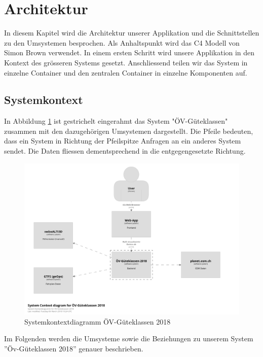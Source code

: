 
\section{Architektur}
\label{Architektur}

In diesem Kapitel wird die Architektur unserer Applikation und die Schnittstellen zu den Umsystemen besprochen. Als Anhaltspunkt wird das C4 Modell \cite{c4model} von Simon Brown verwendet. In einem ersten Schritt wird unsere Applikation in den Kontext des grösseren Systems gesetzt. Anschliessend teilen wir das System  in einzelne Container und den zentralen Container  in einzelne Komponenten auf.

\subsection{Systemkontext}
\label{Architektur:Systemkontext}

In Abbildung \ref{fig:system-context-diagram} ist gestrichelt eingerahmt das System "ÖV-Güteklassen" zusammen mit den dazugehörigen Umsystemen dargestellt. Die Pfeile bedeuten, dass ein System in Richtung der Pfeilspitze Anfragen an ein anderes System sendet. Die Daten fliessen dementsprechend in die entgegengesetzte Richtung.

\begin{figure}[ht]
    \centering
    \includegraphics[width=1\linewidth]{projectdoc/img/systemcontext-diagram.png}
    \caption[Systemkontextdiagramm]{Systemkontextdiagramm ÖV-Güteklassen 2018}
    \label{fig:system-context-diagram}
\end{figure}

Im Folgenden werden die Umsysteme sowie die Beziehungen zu unserem System ''Öv-Güteklassen 2018'' genauer beschrieben.

